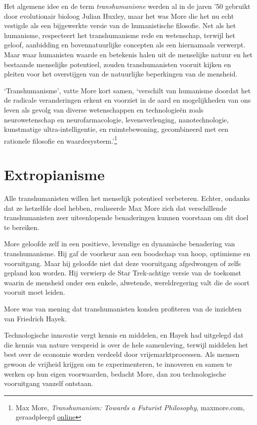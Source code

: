 \documentclass[
  a5paper,
  smalldemyvopaper,11pt,twoside,onecolumn,openright,extrafontsizes,
hidelinks]{memoir}
\begin{document}
Het algemene idee en de term \emph{transhumanisme} werden al in de jaren
'50 gebruikt door evolutionair bioloog Julian Huxley, maar het was More
die het nu echt vestigde als een bijgewerkte versie van de humanistische
filosofie. Net als het humanisme, respecteert het transhumanisme rede en
wetenschap, terwijl het geloof, aanbidding en bovennatuurlijke concepten
als een hiernamaals verwerpt. Maar waar humanisten waarde en betekenis
halen uit de menselijke natuur en het bestaande menselijke potentieel,
zouden transhumanisten vooruit kijken en pleiten voor het overstijgen
van de natuurlijke beperkingen van de mensheid.

`Transhumanisme', vatte More kort samen, `verschilt van humanisme
doordat het de radicale veranderingen erkent en voorziet in de aard en
mogelijkheden van ons leven als gevolg van diverse wetenschappen en
technologieën zoals neurowetenschap en neurofarmacologie,
levensverlenging, nanotechnologie, kunstmatige ultra-intelligentie, en
ruimtebewoning, gecombineerd met een rationele filosofie en
waardesysteem.'\footnote{Max More, \emph{Transhumanism: Towards a
  Futurist Philosophy}, maxmore.com, geraadpleegd
  \href{https://web.archive.org/web/20051029125153/http://www.maxmore.com/transhum.htm}{online}}

\section{Extropianisme}\label{extropianisme}

Alle transhumanisten willen het menselijk potentieel verbeteren. Echter,
ondanks dat ze hetzelfde doel hebben, realiseerde Max More zich dat
verschillende transhumanisten zeer uiteenlopende benaderingen kunnen
voorstaan om dit doel te bereiken.

More geloofde zelf in een positieve, levendige en dynamische benadering
van transhumanisme. Hij gaf de voorkeur aan een boodschap van hoop,
optimisme en vooruitgang. Maar hij geloofde niet dat deze vooruitgang
afgedwongen of zelfs gepland kon worden. Hij verwierp de Star
Trek-achtige versie van de toekomst waarin de mensheid onder een enkele,
alwetende, wereldregering valt die de soort vooruit moet leiden.

More was van mening dat transhumanisten konden profiteren van de
inzichten van Friedrich Hayek.

Technologische innovatie vergt kennis en middelen, en Hayek had
uitgelegd dat die kennis van nature verspreid is over de hele
samenleving, terwijl middelen het best over de economie worden verdeeld
door vrijemarktprocessen. Als mensen gewoon de vrijheid krijgen om te
experimenteren, te innoveren en samen te werken op hun eigen
voorwaarden, bedacht More, dan zou technologische vooruitgang vanzelf
ontstaan.
\end{document}
